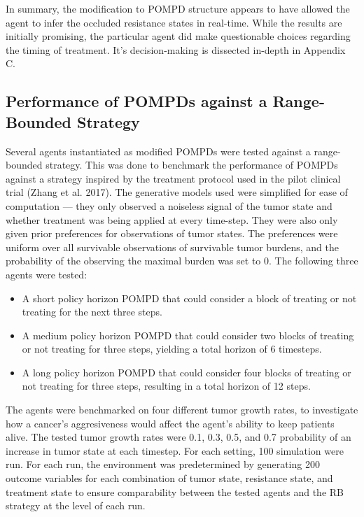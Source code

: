 \documentclass[
]{article}
\providecommand{\tightlist}{%
  \setlength{\itemsep}{0pt}\setlength{\parskip}{0pt}}
\begin{document}
In summary, the modification to POMPD structure appears to have allowed
the agent to infer the occluded resistance states in real-time. While
the results are initially promising, the particular agent did make
questionable choices regarding the timing of treatment. It's
decision-making is dissected in-depth in Appendix C.

\subsection{Performance of POMPDs against a Range-Bounded
Strategy}\label{performance-of-pompds-against-a-range-bounded-strategy}

Several agents instantiated as modified POMPDs were tested against a
range-bounded strategy. This was done to benchmark the performance of
POMPDs against a strategy inspired by the treatment protocol used in the
pilot clinical trial (Zhang et al. 2017). The generative models used
were simplified for ease of computation --- they only observed a
noiseless signal of the tumor state and whether treatment was being
applied at every time-step. They were also only given prior preferences
for observations of tumor states. The preferences were uniform over all
survivable observations of survivable tumor burdens, and the probability
of the observing the maximal burden was set to 0. The following three
agents were tested:

\begin{itemize}
\tightlist
\item
  A short policy horizon POMPD that could consider a block of treating
  or not treating for the next three steps.
\item
  A medium policy horizon POMPD that could consider two blocks of
  treating or not treating for three steps, yielding a total horizon of
  6 timesteps.
\item
  A long policy horizon POMPD that could consider four blocks of
  treating or not treating for three steps, resulting in a total horizon
  of 12 steps.
\end{itemize}

The agents were benchmarked on four different tumor growth rates, to
investigate how a cancer's aggresiveness would affect the agent's
ability to keep patients alive. The tested tumor growth rates were 0.1,
0.3, 0.5, and 0.7 probability of an increase in tumor state at each
timestep. For each setting, 100 simulation were run. For each run, the
environment was predetermined by generating 200 outcome variables for
each combination of tumor state, resistance state, and treatment state
to ensure comparability between the tested agents and the RB strategy at
the level of each run.
\end{document}
